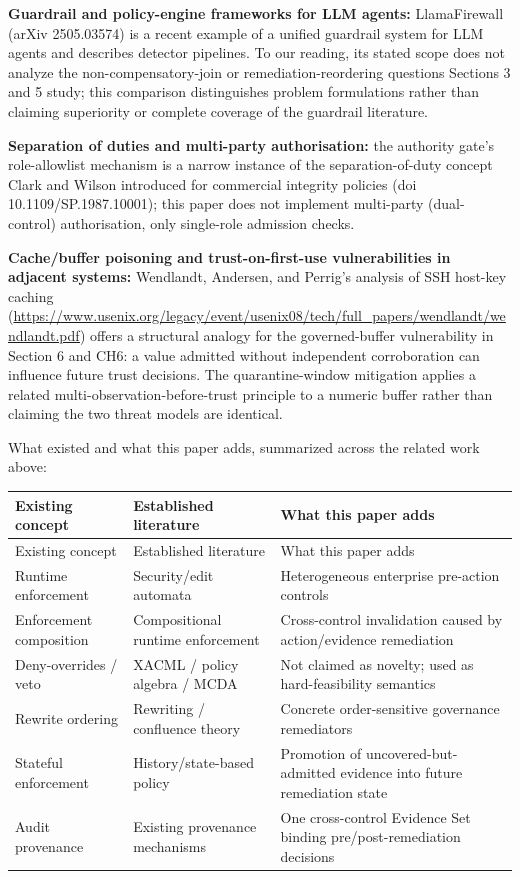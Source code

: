 \documentclass[11pt,a4paper]{article}
\theoremstyle{definition}
\begin{document}
\noindent\textbf{Guardrail and policy-engine frameworks for LLM agents:} LlamaFirewall (arXiv 2505.03574) is a recent example of a unified guardrail system for LLM agents and describes detector pipelines. To our reading, its stated scope does not analyze the non-compensatory-join or remediation-reordering questions Sections 3 and 5 study; this comparison distinguishes problem formulations rather than claiming superiority or complete coverage of the guardrail literature.

\noindent\textbf{Separation of duties and multi-party authorisation:} the authority gate's role-allowlist mechanism is a narrow instance of the separation-of-duty concept Clark and Wilson introduced for commercial integrity policies (doi 10.1109/SP.1987.10001); this paper does not implement multi-party (dual-control) authorisation, only single-role admission checks.

\noindent\textbf{Cache/buffer poisoning and trust-on-first-use vulnerabilities in adjacent systems:} Wendlandt, Andersen, and Perrig's analysis of SSH host-key caching (\url{https://www.usenix.org/legacy/event/usenix08/tech/full_papers/wendlandt/wendlandt.pdf}) offers a structural analogy for the governed-buffer vulnerability in Section 6 and CH6: a value admitted without independent corroboration can influence future trust decisions. The quarantine-window mitigation applies a related multi-observation-before-trust principle to a numeric buffer rather than claiming the two threat models are identical.

\noindent What existed and what this paper adds, summarized across the related work above:

\begin{longtable}{>{\raggedright\arraybackslash}p{}>{\raggedright\arraybackslash}p{}>{\raggedright\arraybackslash}p{}}
\toprule
Existing concept & Established literature & What this paper adds \\
\midrule
\endfirsthead
\toprule
Existing concept & Established literature & What this paper adds \\
\midrule
\endhead
\bottomrule
\endfoot
Runtime enforcement & Security/edit automata & Heterogeneous enterprise pre-action controls \\
Enforcement composition & Compositional runtime enforcement & Cross-control invalidation caused by action/evidence remediation \\
Deny-overrides / veto & XACML / policy algebra / MCDA & Not claimed as novelty; used as hard-feasibility semantics \\
Rewrite ordering & Rewriting / confluence theory & Concrete order-sensitive governance remediators \\
Stateful enforcement & History/state-based policy & Promotion of uncovered-but-admitted evidence into future remediation state \\
Audit provenance & Existing provenance mechanisms & One cross-control Evidence Set binding pre/post-remediation decisions \\
\end{longtable}
\end{document}
